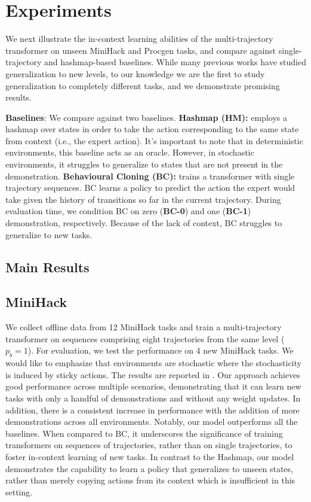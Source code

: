 \section{Experiments}
\label{sec:main_expts}

We next illustrate the in-context learning abilities of the multi-trajectory transformer on unseen MiniHack and Procgen tasks, and compare against single-trajectory and hashmap-based baselines. While many previous works have studied generalization to new levels, to our knowledge we are the first to study generalization to completely different tasks, and we demonstrate promising results. 



\textbf{Baselines}: We compare against two baselines. \textbf{Hashmap (HM):} employs a hashmap over states in order to take the action corresponding to the same state from context (i.e., the expert action). It's important to note that in deterministic environments, this baseline acts as an oracle. However, in stochastic environments, it struggles to generalize to states that are not present in the demonstration. \textbf{Behavioural Cloning (BC):} trains a transformer with single trajectory sequences. BC learns a policy to predict the action the expert would take given the history of transitions so far in the current trajectory. During evaluation time, we condition BC on zero (\textbf{BC-0}) and one (\textbf{BC-1}) demonstration, respectively. Because of the lack of context, BC struggles to generalize to new tasks. 

\subsection{Main Results}
\label{sec:main_results}
\subsection{MiniHack} We collect offline data from 12 MiniHack tasks and train a multi-trajectory transformer on sequences comprising eight trajectories from the same level ($p_b = 1$). For evaluation, we test the performance on 4 new MiniHack tasks. We would like to emphasize that environments are stochastic where the stochasticity is induced by sticky actions. The results are reported in . Our approach achieves good performance across multiple scenarios, demonstrating that it can learn new tasks with only a handful of demonstrations and without any weight updates. In addition, there is a consistent increase in performance with the addition of more demonstrations across all environments. Notably, our model outperforms all the baselines. When compared to BC, it underscores the significance of training transformers on sequences of trajectories, rather than on single trajectories, to foster in-context learning of new tasks. In contrast to the Hashmap, our model demonstrates the capability to learn a policy that generalizes to unseen states, rather than merely copying actions from its context which is insufficient in this setting.


